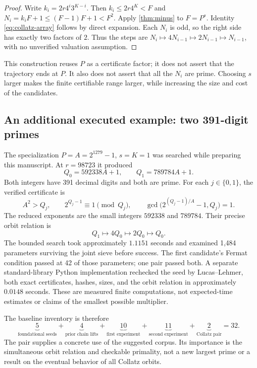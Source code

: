 \documentclass[11pt,a4paper]{article}
\theoremstyle{definition}\newtheorem{definition}[theorem]{Definition}
\theoremstyle{remark}\newtheorem{remark}[theorem]{Remark}
\begin{document}
\begin{proof}
Write $k_i=2r4^i3^{K-i}$. Then $k_i\le2r4^K<F$ and
$N_i=k_iF+1\le(F-1)F+1<F^2$. Apply \cref{thm:minus} to $F=P^s$.
Identity \eqref{eq:collatz-array} follows by direct expansion. Each $N_i$ is
odd, so the right side has exactly two factors of $2$. Thus the steps are
$N_i\mapsto4N_{i-1}\mapsto2N_{i-1}\mapsto N_{i-1}$, with no unverified
valuation assumption.
\end{proof}

This construction reuses $P$ as a certificate factor; it does not assert that
the trajectory ends at $P$. It also does not assert that all the $N_i$ are
prime. Choosing $s$ larger makes the finite certifiable range larger, while
increasing the size and cost of the candidates.

\subsection{An additional executed example: two 391-digit primes}

The specialization $P=A=2^{1279}-1$, $s=K=1$ was searched while preparing
this manuscript. At $r=98723$ it produced
\begin{equation}\label{eq:collatz-pair}
 \boxed{Q_0=592338A+1,\qquad Q_1=789784A+1.}
\end{equation}
Both integers have 391 decimal digits and both are prime. For each
$j\in\{0,1\}$, the verified certificate is
\[
 A^2>Q_j,\qquad 2^{Q_j-1}\equiv1\pmod{Q_j},\qquad
 \gcd\bigl(2^{(Q_j-1)/A}-1,Q_j\bigr)=1.
\]
The reduced exponents are the small integers $592338$ and $789784$.
Their precise orbit relation is
\[
 Q_1\longmapsto4Q_0\longmapsto2Q_0\longmapsto Q_0.
\]
The bounded search took approximately $1.1151$ seconds and examined 1,484
parameters surviving the joint sieve before success. The first candidate's
Fermat condition passed at 42 of those parameters; one pair passed both.
A separate standard-library Python implementation rechecked the seed by
Lucas--Lehmer, both exact certificates, hashes, sizes, and the orbit relation
in approximately $0.0148$ seconds. These are measured finite computations,
not expected-time estimates or claims of the smallest possible multiplier.

The baseline inventory is therefore
\[
 \underbrace{5}_{\text{foundational seeds}}
 +\underbrace{4}_{\text{prior chain lifts}}
 +\underbrace{10}_{\text{first experiment}}
 +\underbrace{11}_{\text{second experiment}}
 +\underbrace{2}_{\text{Collatz pair}}
 =32.
\]
The pair supplies a concrete use of the suggested corpus. Its importance is
the simultaneous orbit relation and checkable primality, not a new largest
prime or a result on the eventual behavior of all Collatz orbits.
\end{document}
